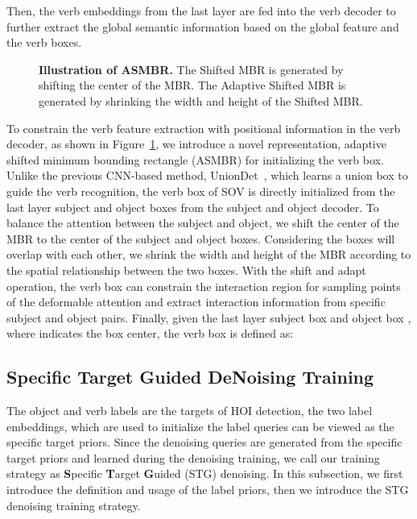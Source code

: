 \documentclass[10pt,twocolumn,letterpaper]{article}
\begin{document}
Then, the verb embeddings from the last layer are fed into the verb decoder to further extract the global semantic information based on the global feature  and the verb boxes.

\begin{figure}[t]
    \centering
    \caption{
        \textbf{Illustration of ASMBR.} The Shifted MBR is generated by shifting the center of the MBR.
        The Adaptive Shifted MBR is generated by shrinking the width and height of the Shifted MBR.
    }
    \label{fig:asmbr}
\end{figure}

\quad To constrain the verb feature extraction with positional information in the verb decoder, as shown in Figure~\ref{fig:asmbr}, we introduce a novel representation, adaptive shifted minimum bounding rectangle (ASMBR) for initializing the verb box.
Unlike the previous CNN-based method, UnionDet~\cite{kim2020uniondet}, which learns a union box to guide the verb recognition, the verb box of SOV is directly initialized from the last layer subject and object boxes from the subject and object decoder.
To balance the attention between the subject and object, we shift the center of the MBR to the center of the subject and object boxes.
Considering the boxes will overlap with each other, we shrink the width and height of the MBR according to the spatial relationship between the two boxes.
With the shift and adapt operation, the verb box can constrain the interaction region for sampling points of the deformable attention and extract interaction information from specific subject and object pairs.
Finally, given the last layer subject box  and object box , where  indicates the box center, the verb box is defined as:



\subsection{Specific Target Guided DeNoising Training}
The object and verb labels are the targets of HOI detection, the two label embeddings, which are used to initialize the label queries can be viewed as the specific target priors.
Since the denoising queries are generated from the specific target priors and learned during the denoising training, we call our training strategy as \textbf{S}pecific \textbf{T}arget \textbf{G}uided (STG) denoising.
In this subsection, we first introduce the definition and usage of the label priors, then we introduce the STG denoising training strategy.
\end{document}
